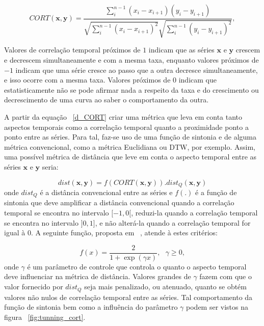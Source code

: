 \begin{equation} \label{d_CORT}
CORT (\bm{x},\bm{y}) = \frac{\sum_{i}^{n-1}(x_i-x_{i+1}) (y_i-y_{i+1})}{\sqrt{\sum_{i}^{n-1}(x_i-x_{i+1})^2}\sqrt{\sum_{i}^{n-1}(y_i-y_{i+1})^2}},
\end{equation}

Valores de correlação temporal próximos de $1$ indicam que as séries $\bm{x}$ e $\bm{y}$ crescem e decrescem simultaneamente e com a mesma taxa, enquanto valores próximos de $-1$ indicam que uma série cresce ao passo que a outra decresce simultaneamente, e isso ocorre com a mesma taxa. Valores próximos de $0$ indicam que estatisticamente não se pode afirmar nada a respeito da taxa e do crescimento ou decrescimento de uma curva ao saber o comportamento da outra.

A partir da equação ~\ref{d_CORT} criar uma métrica que leva em conta tanto aspectos temporais como a correlação temporal quanto a proximidade ponto a ponto entre as séries. Para tal, faz-se uso de uma função de sintonia e de alguma métrica convencional, como a métrica Euclidiana ou DTW, por exemplo. Assim, uma possível métrica de distância que leve em conta o aspecto temporal  entre as séries $\bm{x}$ e $\bm{y}$ seria:

\begin{equation}
dist(\bm{x},\bm{y}) = f(CORT (\bm{x},\bm{y})).dist_Q(\bm{x},\bm{y}) 
\end{equation}
onde $dist_Q$ é a distância convencional entre as séries e $f(.)$ é a função de sintonia que deve amplificar a distância convencional quando a correlação temporal se encontra no intervalo $[-1,0[$, reduzi-la quando a correlação temporal se encontra no intervalo $]0,1]$, e não alterá-la quando a correlação temporal for igual à $0$. A seguinte função, proposta em  ~\parencite{cort}, atende à estes critérios:

\begin{equation} \label{eq:tunning_func}
f(x) = \frac{2}{1+\exp(\gamma x)},\text{ 				} \gamma \geq 0,
\end{equation}
onde $\gamma$ é um parâmetro de controle que controla o quanto o aspecto temporal deve influenciar na métrica de distância. Valores grandes de $\gamma$ fazem com que o valor fornecido por $dist_Q$ seja mais penalizado, ou atenuado, quanto se obtém valores não nulos de correlação temporal entre as séries. Tal comportamento da função de sintonia bem como a influência do parâmetro $\gamma$ podem ser vistos na figura ~\ref{fig:tunning_cort}.

